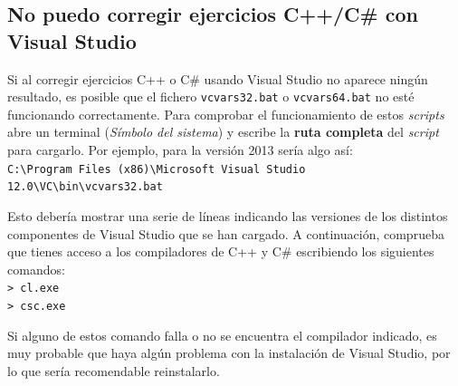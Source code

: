 \documentclass[]{article}
\begin{document}
\subsection{No puedo corregir ejercicios C++/C\# con Visual Studio}
Si al corregir ejercicios C++ o C\# usando Visual Studio no aparece ningún resultado, es  posible que el fichero \texttt{vcvars32.bat} o \texttt{vcvars64.bat} no esté funcionando correctamente. Para comprobar el funcionamiento de estos \emph{scripts} abre un terminal (\emph{Símbolo del sistema}) y escribe la \textbf{ruta completa} del \emph{script} para cargarlo. Por ejemplo, para la versión 2013 sería algo así: \\
{\small \texttt{C:\textbackslash Program Files (x86)\textbackslash Microsoft Visual Studio 12.0\textbackslash VC\textbackslash bin\textbackslash vcvars32.bat}}

 Esto debería mostrar una serie de líneas indicando las versiones de los distintos componentes de Visual Studio que se han cargado. A continuación, comprueba que tienes acceso a los compiladores de C++ y C\# escribiendo los siguientes comandos:\\
\texttt{> cl.exe}\\
\texttt{> csc.exe}

Si alguno de estos comando falla o no se encuentra el compilador indicado, es muy probable que haya algún problema con la instalación de Visual Studio, por lo que sería recomendable reinstalarlo.
\end{document}
